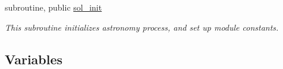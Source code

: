 {\bf }\par
\begin{DoxyCompactItemize}
\item 
subroutine, public \hyperlink{namespacemodule__radiation__astronomy_a00825c1a13e09455c478efa11314cb2d}{sol\+\_\+init}                                                                                           
\begin{DoxyCompactList}\small\item\em This subroutine initializes astronomy process, and set up module constants. \end{DoxyCompactList}\end{DoxyCompactItemize}

\subsection*{Variables}
